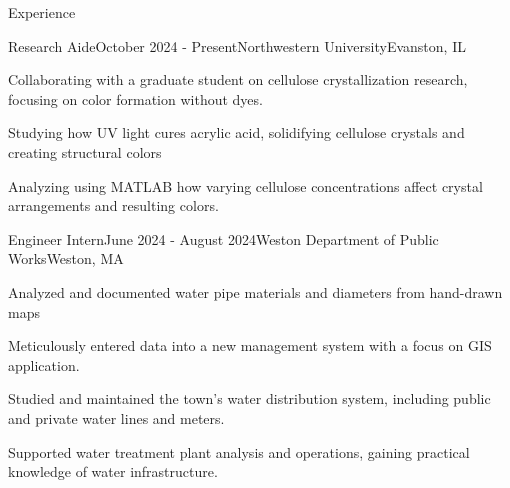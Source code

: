 \documentclass[
	a4paper, %
	9pt, %
]{resume} %
\begin{document}
\begin{rSection}{Experience}

	\begin{rSubsection}{Research Aide}{October 2024 - Present}{Northwestern University}{Evanston, IL}
		\item Collaborating with a graduate student on cellulose crystallization research, focusing on color formation without dyes.
		\item Studying how UV light cures acrylic acid, solidifying cellulose crystals and creating structural colors
		\item Analyzing using MATLAB how varying cellulose concentrations affect crystal arrangements and resulting colors.
	\end{rSubsection}



	\begin{rSubsection}{Engineer Intern}{June 2024 - August 2024}{Weston Department of Public Works}{Weston, MA}
		\item Analyzed and documented water pipe materials and diameters from hand-drawn maps
		\item Meticulously entered data into a new management system with a focus on GIS application.
		\item Studied and maintained the town’s water distribution system, including public and private water lines and meters.
		\item Supported water treatment plant analysis and operations, gaining practical knowledge of water infrastructure.
	\end{rSubsection}



\end{rSection}
\end{document}
